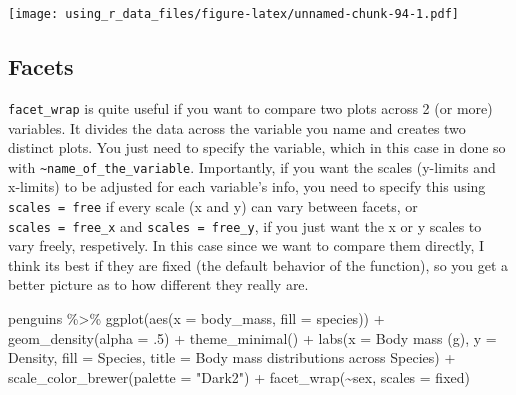 \documentclass[
]{book}
\newenvironment{Shaded}{\begin{snugshade}}{\end{snugshade}}
\newcommand{\AttributeTok}[1]{\textcolor[rgb]{0.77,0.63,0.00}{#1}}
\newcommand{\DecValTok}[1]{\textcolor[rgb]{0.00,0.00,0.81}{#1}}
\newcommand{\FunctionTok}[1]{\textcolor[rgb]{0.00,0.00,0.00}{#1}}
\newcommand{\NormalTok}[1]{#1}
\newcommand{\SpecialCharTok}[1]{\textcolor[rgb]{0.00,0.00,0.00}{#1}}
\newcommand{\StringTok}[1]{\textcolor[rgb]{0.31,0.60,0.02}{#1}}
\begin{document}
\texttt{[image: using\_r\_data\_files/figure-latex/unnamed-chunk-94-1.pdf]}

\hypertarget{facets}{%
\subsection{Facets}\label{facets}}

\texttt{facet\_wrap} is quite useful if you want to compare two plots across 2 (or more) variables.
It divides the data across the variable you name and creates two distinct plots.
You just need to specify the variable, which in this case in done so with \texttt{\textasciitilde{}name\_of\_the\_variable}.
Importantly, if you want the scales (y-limits and x-limits) to be adjusted for each variable's info, you need to specify this using \texttt{scales\ =\ \textquotesingle{}free\textquotesingle{}} if every scale (x and y) can vary between facets, or \texttt{scales\ =\ \textquotesingle{}free\_x\textquotesingle{}} and \texttt{scales\ =\ \textquotesingle{}free\_y\textquotesingle{}}, if you just want the x or y scales to vary freely, respetively.
In this case since we want to compare them directly, I think its best if they are fixed (the default behavior of the function), so you get a better picture as to how different they really are.

\begin{Shaded}
\begin{Highlighting}[]
\NormalTok{penguins }\SpecialCharTok{\%\textgreater{}\%} 
  \FunctionTok{ggplot}\NormalTok{(}\FunctionTok{aes}\NormalTok{(}\AttributeTok{x =}\NormalTok{ body\_mass, }\AttributeTok{fill =}\NormalTok{ species)) }\SpecialCharTok{+} 
  \FunctionTok{geom\_density}\NormalTok{(}\AttributeTok{alpha =}\NormalTok{ .}\DecValTok{5}\NormalTok{) }\SpecialCharTok{+}
  \FunctionTok{theme\_minimal}\NormalTok{() }\SpecialCharTok{+}
  \FunctionTok{labs}\NormalTok{(}\AttributeTok{x =} \StringTok{\textquotesingle{}Body mass (g)\textquotesingle{}}\NormalTok{, }\AttributeTok{y =} \StringTok{\textquotesingle{}Density\textquotesingle{}}\NormalTok{,}
       \AttributeTok{fill =} \StringTok{\textquotesingle{}Species\textquotesingle{}}\NormalTok{, }
       \AttributeTok{title =} \StringTok{\textquotesingle{}Body mass distributions across Species\textquotesingle{}}\NormalTok{) }\SpecialCharTok{+}
  \FunctionTok{scale\_color\_brewer}\NormalTok{(}\AttributeTok{palette =} \StringTok{"Dark2"}\NormalTok{) }\SpecialCharTok{+}
  \FunctionTok{facet\_wrap}\NormalTok{(}\SpecialCharTok{\textasciitilde{}}\NormalTok{sex, }\AttributeTok{scales =} \StringTok{\textquotesingle{}fixed\textquotesingle{}}\NormalTok{)}
\end{Highlighting}
\end{Shaded}
\end{document}
